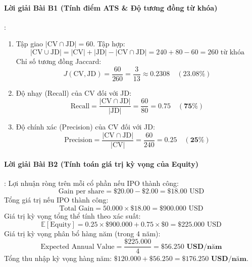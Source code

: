 \paragraph{Lời giải Bài B1 (Tính điểm ATS \& Độ tương đồng từ khóa)}:
\begin{enumerate}
  \item Tập giao $|\text{CV} \cap \text{JD}| = 60$.
  Tập hợp:
  \begin{equation*}
  |\text{CV} \cup \text{JD}| = |\text{CV}| + |\text{JD}| - |\text{CV} \cap \text{JD}| = 240 + 80 - 60 = 260 \text{ từ khóa}
  \end{equation*}
  Chỉ số tương đồng Jaccard:
  \begin{equation*}
  J(\text{CV}, \text{JD}) = \frac{60}{260} = \frac{3}{13} \approx \mathbf{0.2308} \quad (\mathbf{23.08\%})
  \end{equation*}
  \item Độ nhạy (Recall) của CV đối với JD:
  \begin{equation*}
  \text{Recall} = \frac{|\text{CV} \cap \text{JD}|}{|\text{JD}|} = \frac{60}{80} = \mathbf{0.75} \quad (\mathbf{75\%})
  \end{equation*}
  \item Độ chính xác (Precision) của CV đối với JD:
  \begin{equation*}
  \text{Precision} = \frac{|\text{CV} \cap \text{JD}|}{|\text{CV}|} = \frac{60}{240} = \mathbf{0.25} \quad (\mathbf{25\%})
  \end{equation*}
\end{enumerate}

\paragraph{Lời giải Bài B2 (Tính toán giá trị kỳ vọng của Equity)}:
Lợi nhuận ròng trên mỗi cổ phần nếu IPO thành công:
\begin{equation*}
\text{Gain per share} = \$20.00 - \$2.00 = \$18.00\text{ USD}
\end{equation*}
Tổng giá trị nếu IPO thành công:
\begin{equation*}
\text{Total Gain} = 50.000 \times \$18.00 = \$900.000\text{ USD}
\end{equation*}
Giá trị kỳ vọng tổng thể tính theo xác suất:
\begin{equation*}
\mathbb{E}[\text{Equity}] = 0.25 \times \$900.000 + 0.75 \times \$0 = \$225.000\text{ USD}
\end{equation*}
Giá trị kỳ vọng phân bổ hàng năm (trong 4 năm):
\begin{equation*}
\text{Expected Annual Value} = \frac{\$225.000}{4} = \mathbf{\$56.250\text{ USD/năm}}
\end{equation*}
Tổng thu nhập kỳ vọng hàng năm: $\$120.000 + \$56.250 = \mathbf{\$176.250\text{ USD/năm}}$.

